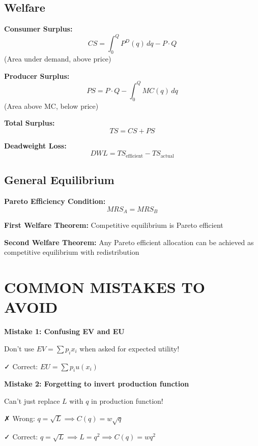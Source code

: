 \documentclass[10pt,letterpaper]{article}
\begin{document}
\subsection{Welfare}

\begin{tcolorbox}[colback=formulacolor!5,colframe=formulacolor,title={\textbf{Consumer \& Producer Surplus}}]
\textbf{Consumer Surplus:}
\[
CS = \int_0^Q P^D(q) \, dq - P \cdot Q
\]
(Area under demand, above price)

\textbf{Producer Surplus:}
\[
PS = P \cdot Q - \int_0^Q MC(q) \, dq
\]
(Area above MC, below price)

\textbf{Total Surplus:}
\[
TS = CS + PS
\]

\textbf{Deadweight Loss:}
\[
DWL = TS_{\text{efficient}} - TS_{\text{actual}}
\]
\end{tcolorbox}

\subsection{General Equilibrium}

\begin{tcolorbox}[colback=formulacolor!5,colframe=formulacolor,title={\textbf{Pareto Efficiency}}]
\textbf{Pareto Efficiency Condition:}
\[
MRS_A = MRS_B
\]

\textbf{First Welfare Theorem:} Competitive equilibrium is Pareto efficient

\textbf{Second Welfare Theorem:} Any Pareto efficient allocation can be achieved as competitive equilibrium with redistribution
\end{tcolorbox}

\newpage

\section{COMMON MISTAKES TO AVOID}

\begin{warningbox}
\textbf{Mistake 1: Confusing EV and EU}

Don't use $EV = \sum p_i x_i$ when asked for expected utility!

✓ Correct: $EU = \sum p_i u(x_i)$
\end{warningbox}

\begin{warningbox}
\textbf{Mistake 2: Forgetting to invert production function}

Can't just replace $L$ with $q$ in production function!

✗ Wrong: $q = \sqrt{L} \implies C(q) = w\sqrt{q}$

✓ Correct: $q = \sqrt{L} \implies L = q^2 \implies C(q) = wq^2$
\end{warningbox}
\end{document}
